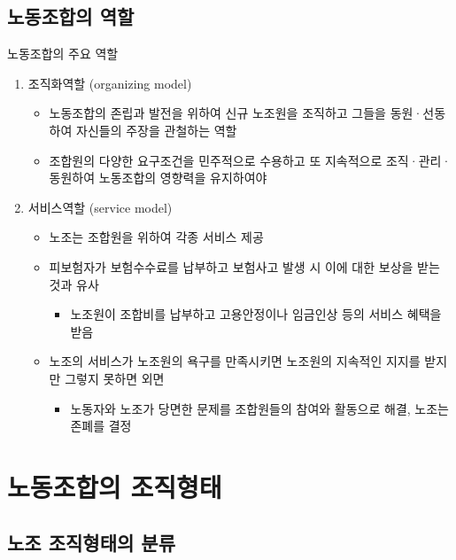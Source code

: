 \documentclass[aspectratio=169,xcolor=dvipsnames,handout]{beamer}
\begin{document}
\subsection{노동조합의 역할}

\begin{frame}[allowframebreaks]{노동조합의 주요 역할}
    \begin{enumerate}[<+->]
        \item 조직화역할 (organizing model)
        \begin{itemize}[<+->]
            \item 노동조합의 존립과 발전을 위하여 신규 노조원을 조직하고 그들을 동원·선동하여 자신들의 주장을 관철하는 역할
            \item 조합원의 다양한 요구조건을 민주적으로 수용하고 또 지속적으로 조직·관리·동원하여 노동조합의 영향력을 유지하여야 
        \end{itemize}
        \framebreak\relax
        \item 서비스역할 (service model)
        \begin{itemize}[<+->]
            \item 노조는 조합원을 위하여 각종 서비스 제공
            \item 피보험자가 보험수수료를 납부하고 보험사고 발생 시 이에 대한 보상을 받는 것과 유사
            \begin{itemize}[<+->]
                \item 노조원이 조합비를 납부하고 고용안정이나 임금인상 등의 서비스 혜택을 받음
            \end{itemize}
            \item 노조의 서비스가 노조원의 욕구를 만족시키면 노조원의 지속적인 지지를 받지만 그렇지 못하면 외면
            \begin{itemize}[<+->]
                \item 노동자와 노조가 당면한 문제를 조합원들의 참여와 활동으로 해결, 노조는 존폐를 결정
            \end{itemize}
        \end{itemize}
    \end{enumerate}
\end{frame}

\section{노동조합의 조직형태}

\subsection{노조 조직형태의 분류}
\end{document}
